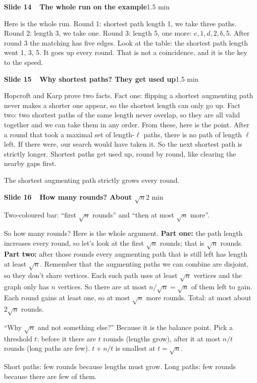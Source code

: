 \documentclass[11pt,a4paper]{article}
\newcommand{\slidehead}[3]{%
  \Needspace{9\baselineskip}\vspace{4pt}\noindent\colorbox{hkblue!12}{\parbox{\dimexpr\linewidth-2\fboxsep}{%
  \textbf{\color{hkblue}Slide #1\ \ #2}\hfill{\small\color{hkgrey}#3}}}\par\vspace{2pt}}
\begin{document}
\slidehead{14}{The whole run on the example}{1.5 min}
\begin{say}
Here is the whole run. Round 1: shortest path length 1, we take three paths. Round 2: length 3, we take one. Round 3: length 5, one more: $e,1,d,2,b,5$. After round 3 the matching has five edges. Look at the table: the shortest path length went 1, 3, 5. It goes up every round. That is not a coincidence, and it is the key to the speed.
\end{say}

\slidehead{15}{Why shortest paths? They get used up}{1.5 min}
\begin{say}
Hopcroft and Karp prove two facts. Fact one: flipping a shortest augmenting path never makes a shorter one appear, so the shortest length can only go up. Fact two: two shortest paths of the same length never overlap, so they are all valid together and we can take them in any order.
From these, here is the point. After a round that took a maximal set of length-$\ell$ paths, there is no path of length $\ell$ left. If there were, our search would have taken it. So the next shortest path is strictly longer. Shortest paths get used up, round by round, like clearing the nearby gaps first.
\end{say}
\begin{key}The shortest augmenting path strictly grows every round.\end{key}

\slidehead{16}{How many rounds? About $\sqrt n$}{2 min}
\begin{onscreen}
Two-coloured bar: ``first $\sqrt n$ rounds'' and ``then at most $\sqrt n$ more''.
\end{onscreen}
\begin{say}
So how many rounds? Here is the whole argument. \textbf{Part one:} the path length increases every round, so let's look at the first $\sqrt n$ rounds; that is $\sqrt n$ rounds. \textbf{Part two:} after those rounds every augmenting path that is still left has length at least $\sqrt n$. Remember that the augmenting paths we can combine are disjoint, so they don't share vertices. Each such path uses at least $\sqrt n$ vertices and the graph only has $n$ vertices. So there are at most $n/\sqrt n=\sqrt n$ of them left to gain. Each round gains at least one, so at most $\sqrt n$ more rounds.
Total: at most about $2\sqrt n$ rounds.
\end{say}
\begin{ask}
``Why $\sqrt n$ and not something else?'' Because it is the balance point. Pick a threshold $t$: before it there are $t$ rounds (lengths grow), after it at most $n/t$ rounds (long paths are few). $t+n/t$ is smallest at $t=\sqrt n$.
\end{ask}
\begin{key}Short paths: few rounds because lengths must grow. Long paths: few rounds because there are few of them.\end{key}
\end{document}
